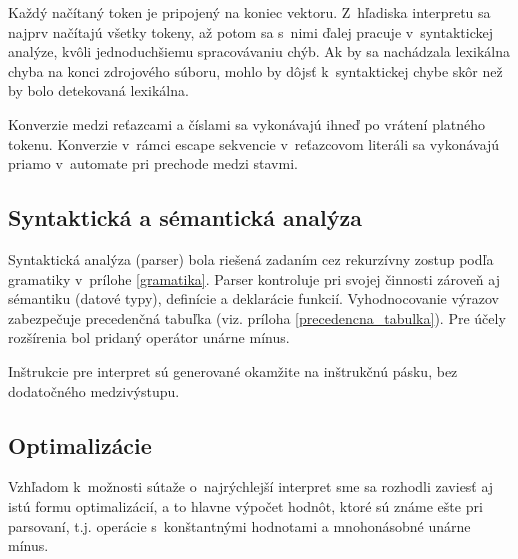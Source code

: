 \documentclass[12pt,a4paper,titlepage,final]{article}
\begin{document}
Každý načítaný token je pripojený na koniec vektoru. Z~hľadiska interpretu sa
najprv načítajú všetky tokeny, až potom sa s~nimi ďalej pracuje v~syntaktickej
analýze, kvôli jednoduchšiemu spracovávaniu chýb. Ak by sa nachádzala
 lexikálna chyba na konci zdrojového súboru, mohlo by dôjsť k~syntaktickej chybe
 skôr než by bolo detekovaná lexikálna.

Konverzie medzi reťazcami a číslami sa vykonávajú ihneď po vrátení platného tokenu.
Konverzie v~rámci escape sekvencie v~reťazcovom literáli sa vykonávajú
 priamo v~automate pri prechode medzi stavmi.

\subsection{Syntaktická a sémantická analýza}
Syntaktická analýza (parser) bola riešená zadaním cez rekurzívny zostup 
 podľa gramatiky v~prílohe \ref{gramatika}.
Parser kontroluje pri svojej činnosti zároveň aj sémantiku (datové typy),
definície a deklarácie funkcií.
Vyhodnocovanie výrazov zabezpečuje precedenčná tabuľka 
 (viz. príloha \ref{precedencna_tabulka}). Pre účely rozšírenia bol
 pridaný operátor unárne mínus.

Inštrukcie pre interpret sú generované okamžite na inštrukčnú pásku,
 bez dodatočného medzivýstupu.

     
     
     
     

\subsection{Optimalizácie}
Vzhľadom k~možnosti sútaže o~najrýchlejší interpret sme sa rozhodli zaviesť aj
istú formu optimalizácií, a to hlavne výpočet hodnôt, ktoré sú známe ešte pri
parsovaní, t.j. operácie s~konštantnými hodnotami a mnohonásobné unárne mínus.
\end{document}
